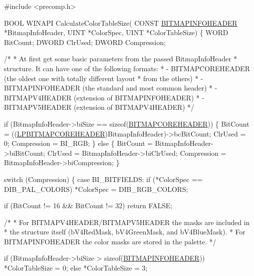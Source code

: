 \begin{DoxyCodeInclude}
\textcolor{preprocessor}{#include <precomp.h>}

BOOL WINAPI
CalculateColorTableSize(
    CONST \hyperlink{struct_b_i_t_m_a_p_i_n_f_o_h_e_a_d_e_r}{BITMAPINFOHEADER} *BitmapInfoHeader,
    UINT *ColorSpec,
    UINT *ColorTableSize)
\{
    WORD BitCount;
    DWORD ClrUsed;
    DWORD Compression;

    \textcolor{comment}{/*}
\textcolor{comment}{     * At first get some basic parameters from the passed BitmapInfoHeader}
\textcolor{comment}{     * structure. It can have one of the following formats:}
\textcolor{comment}{     * - BITMAPCOREHEADER (the oldest one with totally different layout}
\textcolor{comment}{     *                     from the others)}
\textcolor{comment}{     * - BITMAPINFOHEADER (the standard and most common header)}
\textcolor{comment}{     * - BITMAPV4HEADER (extension of BITMAPINFOHEADER)}
\textcolor{comment}{     * - BITMAPV5HEADER (extension of BITMAPV4HEADER)}
\textcolor{comment}{     */}

    \textcolor{keywordflow}{if} (BitmapInfoHeader->biSize == \textcolor{keyword}{sizeof}(\hyperlink{structtag_b_i_t_m_a_p_c_o_r_e_h_e_a_d_e_r}{BITMAPCOREHEADER}))
    \{
        BitCount = ((\hyperlink{structtag_b_i_t_m_a_p_c_o_r_e_h_e_a_d_e_r}{LPBITMAPCOREHEADER})BitmapInfoHeader)->bcBitCount;
        ClrUsed = 0;
        Compression = BI\_RGB;
    \}
    \textcolor{keywordflow}{else}
    \{
        BitCount = BitmapInfoHeader->biBitCount;
        ClrUsed = BitmapInfoHeader->biClrUsed;
        Compression = BitmapInfoHeader->biCompression;
    \}

    \textcolor{keywordflow}{switch} (Compression)
    \{
    \textcolor{keywordflow}{case} BI\_BITFIELDS:
        \textcolor{keywordflow}{if} (*ColorSpec == DIB\_PAL\_COLORS)
            *ColorSpec = DIB\_RGB\_COLORS;

        \textcolor{keywordflow}{if} (BitCount != 16 && BitCount != 32)
            \textcolor{keywordflow}{return} FALSE;

        \textcolor{comment}{/*}
\textcolor{comment}{         * For BITMAPV4HEADER/BITMAPV5HEADER the masks are included in}
\textcolor{comment}{         * the structure itself (bV4RedMask, bV4GreenMask, and bV4BlueMask).}
\textcolor{comment}{         * For BITMAPINFOHEADER the color masks are stored in the palette.}
\textcolor{comment}{         */}

        \textcolor{keywordflow}{if} (BitmapInfoHeader->biSize > \textcolor{keyword}{sizeof}(\hyperlink{struct_b_i_t_m_a_p_i_n_f_o_h_e_a_d_e_r}{BITMAPINFOHEADER}))
            *ColorTableSize = 0;
        \textcolor{keywordflow}{else}
            *ColorTableSize = 3;


\end{DoxyCodeInclude}
